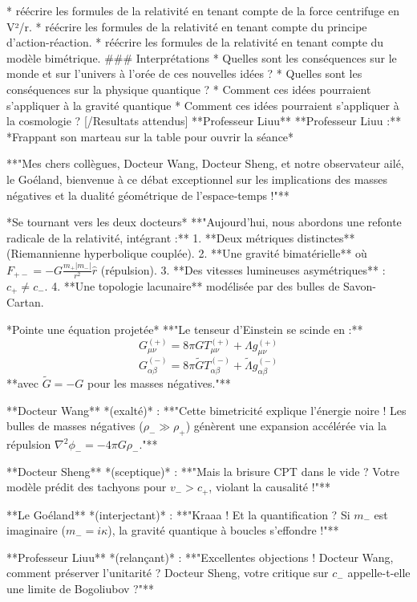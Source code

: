 * réécrire les formules de la relativité en tenant compte de la force centrifuge en V²/r.
* réécrire les formules de la relativité en tenant compte du principe d'action-réaction.
* réécrire les formules de la relativité en tenant compte du modèle bimétrique.
### Interprétations
* Quelles sont les conséquences sur le monde et sur l'univers à l'orée de ces nouvelles idées ?
* Quelles sont les conséquences sur la physique quantique ?
* Comment ces idées pourraient s'appliquer à la gravité quantique
* Comment ces idées pourraient s'appliquer à la cosmologie ?
[/Resultats attendus]
**Professeur Liuu**
**Professeur Liuu :**  
*Frappant son marteau sur la table pour ouvrir la séance*  

**"Mes chers collègues, Docteur Wang, Docteur Sheng, et notre observateur ailé, le Goéland, bienvenue à ce débat exceptionnel sur les implications des masses négatives et la dualité géométrique de l'espace-temps !"**  

*Se tournant vers les deux docteurs*  
**"Aujourd'hui, nous abordons une refonte radicale de la relativité, intégrant :**  
1. **Deux métriques distinctes** (Riemannienne hyperbolique couplée).  
2. **Une gravité bimatérielle** où \( F_{+-} = -G \frac{m_+ |m_-|}{r^2} \hat{r} \) (répulsion).  
3. **Des vitesses lumineuses asymétriques** : \( c_+ \neq c_- \).  
4. **Une topologie lacunaire** modélisée par des bulles de Savon-Cartan.  

*Pointe une équation projetée*  
**"Le tenseur d’Einstein se scinde en :**  
\[ G_{\mu\nu}^{(+)} = 8\pi G T_{\mu\nu}^{(+)} + \Lambda g_{\mu\nu}^{(+)} \]  
\[ G_{\alpha\beta}^{(-)} = 8\pi \tilde{G} T_{\alpha\beta}^{(-)} + \tilde{\Lambda} g_{\alpha\beta}^{(-)} \]  
**avec \( \tilde{G} = -G \) pour les masses négatives."**  

**Docteur Wang** *(exalté)* :  
**"Cette bimetricité explique l’énergie noire ! Les bulles de masses négatives (\( \rho_- \gg \rho_+ \)) génèrent une expansion accélérée via la répulsion \( \nabla^2 \phi_- = -4\pi G \rho_- \)."**  

**Docteur Sheng** *(sceptique)* :  
**"Mais la brisure CPT dans le vide ? Votre modèle prédit des tachyons pour \( v_- > c_+ \), violant la causalité !"**  

**Le Goéland** *(interjectant)* :  
**"Kraaa ! Et la quantification ? Si \( m_- \) est imaginaire (\( m_- = i\kappa \)), la gravité quantique à boucles s’effondre !"**  

**Professeur Liuu** *(relançant)* :  
**"Excellentes objections ! Docteur Wang, comment préserver l’unitarité ? Docteur Sheng, votre critique sur \( c_- \) appelle-t-elle une limite de Bogoliubov ?"**  


